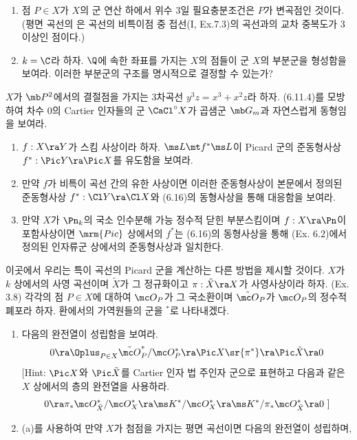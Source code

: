 \begin{enumerate}[label=\tb{6.\arabic*.},itemindent=0mm,itemsep=2mm]
\begin{enumerate}[label=(\alph*)]
	\item 점 $P\in X$가 $X$의 군 연산 하에서 위수 3일 필요충분조건은 $P$가 변곡점인 것이다.
	(평면 곡선의 은 곡선의 비특이점 중 접선(I, Ex.7.3)의 곡선과의 교차 중복도가 3 이상인 점이다.)
	\item $k=\C$라 하자. $\Q$에 속한 좌표를 가지는 $X$의 점들이 군 $X$의 부분군을 형성함을 보여라.
	이러한 부분군의 구조를 명시적으로 결정할 수 있는가?
	\end{enumerate}
	{\renewcommand{\labelenumi}{\tb{*6.\arabic{enumi}.}}
	\item $X$가 $\mb P^2$에서의 결절점을 가지는 3차곡선 $y^3z=x^3+x^2z$라 하자.
	(6.11.4)를 모방하여 차수 0의 Cartier 인자들의 군 $\CaCl^\circ X$가 곱샘군 $\mb G_m$과 자연스럽게 동형임을 보여라.}
	\item \begin{enumerate}[label=(\alph*)]
	\item $f:X\ra Y$가 스킴 사상이라 하자. $\ms L\mt f^*\ms L$이 Picard 군의 준동형사상 $f^*:\Pic Y\ra\Pic X$를 유도함을 보여라.
	\item 만약 $f$가 비특이 곡선 간의 유한 사상이면 이러한 준동형사상이 본문에서 정의된 준동형사상 $f^*:\Cl Y\ra\Cl X$와
	(6.16)의 동형사상을 통해 대응함을 보여라.
	\item 만약 $X$가 $\Pn_k$의 국소 인수분해 가능 정수적 닫힌 부분스킴이며 $f:X\ra\Pn$이 포함사상이면
	$\mrm{Pic}$ 상에서의 $f^*$는 (6.16)의 동형사상을 통해 (Ex. 6.2)에서 정의된 인자류군 상에서의 준동형사상과 일치한다.
	\end{enumerate}
	{\renewcommand{\labelenumi}{\tb{*6.\arabic{enumi}.}}
	\item {} 이곳에서 우리는 특이 곡선의 Picard 군을 계산하는 다른 방법을 제시할 것이다.
	$X$가 $k$ 상에서의 사영 곡선이며 $\tilde X$가 그 정규화이고 $\pi:\tilde X\ra X$가 사영사상이라 하자. (Ex. 3.8)
	각각의 점 $P\in X$에 대하여 $\mc O_P$가 그 국소환이며 $\tilde{\mc O}_P$가 $\mc O_P$의 정수적 폐포라 하자.
	환에서의 가역원들의 군을 ${}^*$로 나타내겠다.
	\begin{enumerate}[label=(\alph*)]
	\item 다음의 완전열이 성립함을 보여라.
	$$0\ra\Oplus_{P\in X}\tilde{\mc O}_P^*/\mc O_P^*\ra\Pic X\sr{\pi^*}\ra\Pic\tilde X\ra 0$$
	[Hint: $\Pic X$와 $\Pic\tilde X$를 Cartier 인자 법 주인자 군으로 표현하고 다음과 같은 $X$ 상에서의 층의 완전열을 사용하라.
	$$0\ra\pi_*\mc O_{\tilde X}^*/\mc O_X^*\ra\ms K^*/\mc O_X^*\ra\ms K^*/\pi_*\mc O_{\tilde X}^*\ra 0\text{ ]}$$
	\item (a)를 사용하여 만약 $X$가 첨점을 가지는 평면 곡선이면 다음의 완전열이 성립하며,

\end{enumerate}}
\end{enumerate}
